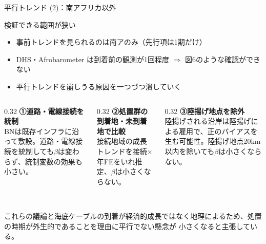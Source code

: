 \documentclass[aspectratio=169,11pt]{beamer}
\begin{document}
\begin{frame}{平行トレンド (2)：南アフリカ以外}
  \begin{alertblock}{検証できる範囲が狭い}
    \begin{itemize}
      \item 事前トレンドを見られるのは\alert{南アのみ}（先行項は1期だけ）
      \item DHS・Afrobarometer は到着前の観測が1回程度 $\Rightarrow$ 図6のような確認ができない
      \item 平行トレンドを崩しうる原因を一つづつ潰していく
    \end{itemize}
  \end{alertblock}
  \vspace{0.4em}
  \begin{columns}[T]
    \begin{column}{0.32\textwidth}
      \textbf{①道路・電線接続を統制}\\[0.2em]
      \small{BNは既存インフラに沿って敷設。道路・電線接続を統制しても$\beta$は変わらず、統制変数の効果も小さい。}
    \end{column}
    \begin{column}{0.32\textwidth}
      \textbf{②処置群の到着地・未到着地で比較}\\[0.2em]
      \small{接続地域の成長トレンドを接続$\times$年FEをいれ推定、$\beta$は小さくならない。}
    \end{column}
    \begin{column}{0.32\textwidth}
      \textbf{③陸揚げ地点を除外}\\[0.2em]
      \small{陸揚げされる沿岸は陸揚げによる雇用で、正のバイアスを生む可能性。陸揚げ地点20km以内を除いても$\beta$は小さくならない。}
    \end{column}
  \end{columns}
  ~\\
  これらの議論と海底ケーブルの到着が経済的成長ではなく地理によるため、処置の時期が外生的であることを理由に平行でない懸念が
  小さくなると主張している。
\end{frame}
\end{document}
